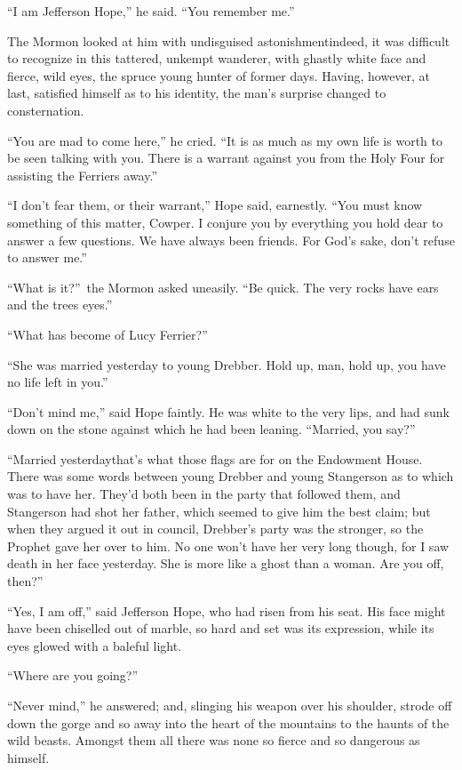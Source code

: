 \documentclass[12pt,english]{book}
\begin{document}
{}``I am Jefferson Hope,'' he said. {}``You remember me.''

The Mormon looked at him with undisguised astonishment\mdsh{---}indeed,
it was difficult to recognize in this tattered, unkempt wanderer,
with ghastly white face and fierce, wild eyes, the spruce young hunter
of former days. Having, however, at last, satisfied himself as to
his identity, the man's surprise changed to consternation.

{}``You are mad to come here,'' he cried. {}``It is as much as
my own life is worth to be seen talking with you. There is a warrant
against you from the Holy Four for assisting the Ferriers away.''

{}``I don't fear them, or their warrant,'' Hope said, earnestly.
{}``You must know something of this matter, Cowper. I conjure you
by everything you hold dear to answer a few questions. We have always
been friends. For God's sake, don't refuse to answer me.''

{}``What is it?''\ the Mormon asked uneasily. {}``Be quick. The
very rocks have ears and the trees eyes.''

{}``What has become of Lucy Ferrier?''

{}``She was married yesterday to young Drebber. Hold up, man, hold
up, you have no life left in you.''

{}``Don't mind me,'' said Hope faintly. He was white to the very
lips, and had sunk down on the stone against which he had been leaning.
{}``Married, you say?''

{}``Married yesterday\mdsh{---}that's what those flags are for on
the Endowment House. There was some words between young Drebber and
young Stangerson as to which was to have her. They'd both been in
the party that followed them, and Stangerson had shot her father,
which seemed to give him the best claim; but when they argued it out
in council, Drebber's party was the stronger, so the Prophet gave
her over to him. No one won't have her very long though, for I saw
death in her face yesterday. She is more like a ghost than a woman.
Are you off, then?''

{}``Yes, I am off,'' said Jefferson Hope, who had risen from his
seat. His face might have been chiselled out of marble, so hard and
set was its expression, while its eyes glowed with a baleful light.

{}``Where are you going?''

{}``Never mind,'' he answered; and, slinging his weapon over his
shoulder, strode off down the gorge and so away into the heart of
the mountains to the haunts of the wild beasts. Amongst them all there
was none so fierce and so dangerous as himself.
\end{document}
